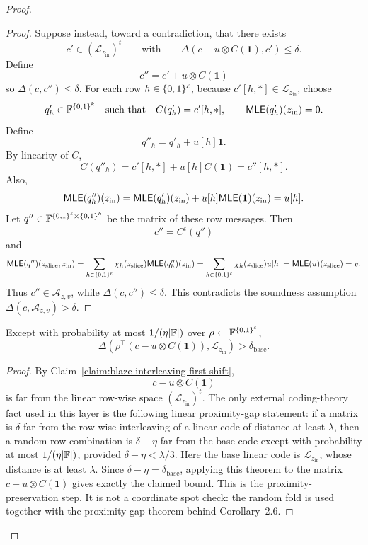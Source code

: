 \begin{proof}
\begin{proof}
Suppose instead, toward a contradiction, that there exists
\[
  c'\in(\mathcal L_{z_{\mathrm{in}}})^t
  \qquad\text{with}\qquad
  \Delta(c-u\otimes C(\mathbf 1),c')\le\delta.
\]
Define
\[
  c''=c'+u\otimes C(\mathbf 1)
\]
so \(\Delta(c,c'')\le\delta\).  For each row \(h\in\{0,1\}^\ell\), because
\(c'[h,\ast]\in\mathcal L_{z_{\mathrm{in}}}\), choose
\[
  q'_h\in\mathbb{F}^{\{0,1\}^k}
  \quad\text{such that}\quad
  C(q'_h)=c'[h,\ast],
  \qquad
  \mathsf{MLE}(q'_h)(z_{\mathrm{in}})=0.
\]
Define
\[
  q''_h=q'_h+u[h]\mathbf 1.
\]
By linearity of \(C\),
\[
  C(q''_h)
  =
  c'[h,\ast]+u[h]C(\mathbf 1)
  =
  c''[h,\ast].
\]
Also,
\[
  \mathsf{MLE}(q''_h)(z_{\mathrm{in}})
  =
  \mathsf{MLE}(q'_h)(z_{\mathrm{in}})
  +
  u[h]\mathsf{MLE}(\mathbf 1)(z_{\mathrm{in}})
  =
  u[h].
\]
Let \(q''\in\mathbb{F}^{\{0,1\}^\ell\times\{0,1\}^k}\) be the matrix of these row messages.  Then
\[
  c''=C^t(q'')
\]
and
\[
  \mathsf{MLE}(q'')(z_{\mathrm{slice}},z_{\mathrm{in}})
  =
  \sum_{h\in\{0,1\}^\ell}\chi_h(z_{\mathrm{slice}})
  \mathsf{MLE}(q''_h)(z_{\mathrm{in}})
  =
  \sum_{h\in\{0,1\}^\ell}\chi_h(z_{\mathrm{slice}})u[h]
  =
  \mathsf{MLE}(u)(z_{\mathrm{slice}})
  =
  v.
\]
Thus \(c''\in\mathcal A_{z,v}\), while \(\Delta(c,c'')\le\delta\).  This
contradicts the soundness assumption \(\Delta(c,\mathcal A_{z,v})>\delta\).
\end{proof}

\begin{claim}
\label{claim:blaze-interleaving-random-fold}
Except with probability at most \(1/(\eta|\mathbb{F}|)\) over
\(\rho\leftarrow\mathbb{F}^{\{0,1\}^\ell}\),
\[
  \Delta\!\left(
    \rho^\top(c-u\otimes C(\mathbf 1)),
    \mathcal L_{z_{\mathrm{in}}}
  \right)>\delta_{\mathrm{base}}.
\]
\end{claim}

\begin{proof}
By Claim~\ref{claim:blaze-interleaving-first-shift},
\[
  c-u\otimes C(\mathbf 1)
\]
is far from the linear row-wise space \((\mathcal L_{z_{\mathrm{in}}})^t\).
The only external coding-theory fact used in this layer is the following
linear proximity-gap statement: if a matrix is
\(\delta\)-far from the row-wise interleaving of a linear code of distance at
least \(\lambda\), then a random row combination is
\(\delta-\eta\)-far from the base code except with probability at most
\(1/(\eta|\mathbb{F}|)\), provided \(\delta-\eta<\lambda/3\).  Here the base linear code
is \(\mathcal L_{z_{\mathrm{in}}}\), whose distance is at least \(\lambda\).
Since \(\delta-\eta=\delta_{\mathrm{base}}\), applying this theorem to the
matrix \(c-u\otimes C(\mathbf 1)\) gives exactly the claimed bound.
This is the proximity-preservation step.  It is not a coordinate spot check:
the random fold is used together with the proximity-gap theorem behind
Corollary~2.6.
\end{proof}


\end{proof}
